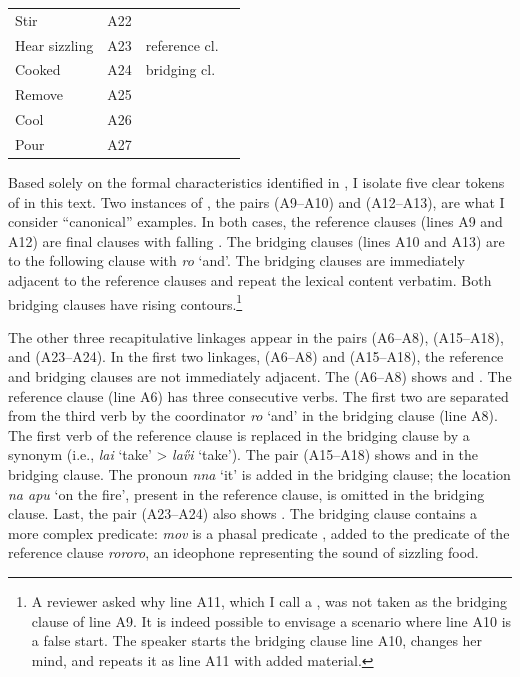 \documentclass[output=paper]{LSP/langsci}
\begin{document}
\begin{table}[]
\begin{tabular}{lcll}
 Stir          & A22     &                &       \\
Hear sizzling   & A23     & reference cl.                  &                 \\
Cooked          & A24     & bridging cl. &                              \\
Remove          & A25     &                 &                 \\
Cool            & A26     &                 &                 \\
Pour            & A27     &                 &                
\end{tabular}
\end{table}

Based solely on the formal characteristics identified in , I isolate five clear tokens of  in this text. Two instances of , the pairs (A9--A10) and (A12--A13), are what I consider ``canonical'' examples. In both cases, the reference clauses (lines A9 and A12) are final clauses with falling .  The bridging clauses (lines A10 and A13) are  to the following clause with \textit{ro} `and'. The bridging clauses are immediately adjacent to the reference clauses and repeat the lexical content verbatim. Both bridging clauses have rising  contours.\footnote{A reviewer asked why line A11, which I call a , was not taken as the bridging clause of line A9. It is indeed possible to envisage a scenario where line A10 is a false start. The speaker starts the bridging clause line A10, changes her mind, and repeats it as line A11 with added  material.}  

The other three recapitulative linkages appear in the pairs (A6--A8), (A15--A18), and (A23--A24). In the first two linkages, (A6--A8) and (A15--A18), the reference and bridging clauses are not immediately adjacent. The  (A6--A8) shows  and . The reference clause (line A6) has three consecutive verbs. The first two are separated from the third verb by the coordinator \textit{ro} `and' in the bridging clause (line A8). The first verb of the reference clause is replaced in the bridging clause by a synonym (i.e., \textit{lai} `take' > \textit{la\H{v}i} `take'). The pair (A15--A18) shows  and  in the bridging clause. The pronoun \textit{nna} `it' is added in the bridging clause; the location \textit{na apu} `on the fire', present in the reference clause, is omitted in the bridging clause. Last, the pair (A23--A24) also shows . The bridging clause contains a more complex predicate: \textit{mov} is a phasal predicate \citep[][342]{guerin11}, added to the predicate of the reference clause \textit{rororo}, an ideophone representing the sound of sizzling food. 
\end{document}
